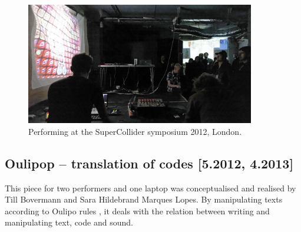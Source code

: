 \documentclass[letterpaper, 12pt]{article}
\begin{document}
\begin{figure}
	\centering
		\includegraphics[width=10cm]{7083569047_14131b8ee2_o}
	\caption{Performing at the SuperCollider symposium 2012, London.}
	\label{fig:fig_7083569047_14131b8ee2_o}
\end{figure}
\parskip 18pt

\subsection{Oulipop -- translation of codes [5.2012, 4.2013]}
\label{sub:oulipop}

This piece for two performers and one laptop was conceptualised and realised by Till Bovermann and Sara Hildebrand Marques Lopes.
By manipulating texts according to Oulipo rules \citep*{mathews2005-oul}, it deals with the relation between writing and manipulating text, code and sound.
\end{document}
